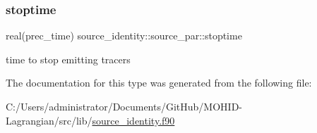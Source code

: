 \mbox{\label{structsource__identity_1_1source__par_a3ab5e22242b41bdcd56480b9d0496efa}} 
\subsubsection{\texorpdfstring{stoptime}{stoptime}}
{\footnotesize\ttfamily real(prec\+\_\+time) source\+\_\+identity\+::source\+\_\+par\+::stoptime\hspace{0.3cm}{\ttfamily [private]}}



time to stop emitting tracers 



The documentation for this type was generated from the following file\+:\begin{DoxyCompactItemize}
\item 
C\+:/\+Users/administrator/\+Documents/\+Git\+Hub/\+M\+O\+H\+I\+D-\/\+Lagrangian/src/lib/\mbox{\hyperlink{source__identity_8f90}{source\+\_\+identity.\+f90}}\end{DoxyCompactItemize}
